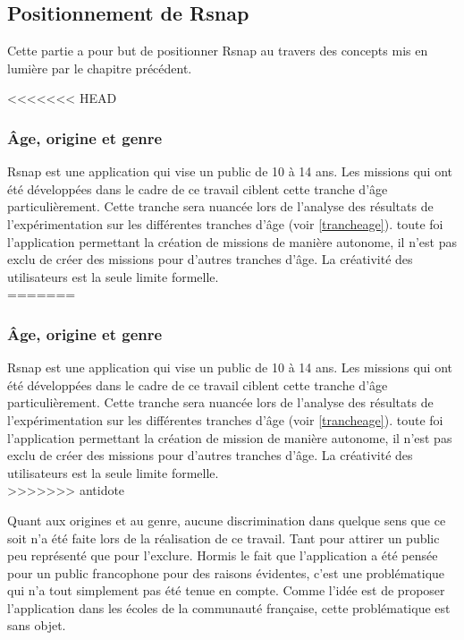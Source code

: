 ﻿\subsection{Positionnement de Rsnap}
Cette partie a pour but de positionner Rsnap au travers des concepts mis en lumière par le chapitre précédent.

<<<<<<< HEAD
\subsubsection{Âge, origine et genre}
\gls{Rsnap} est une application qui vise un public de 10 à 14 ans. Les \glspl{mission} qui ont été développées dans le cadre de ce travail ciblent cette tranche d'âge particulièrement. Cette tranche sera nuancée lors de l'analyse des résultats de l'expérimentation sur les différentes tranches d'âge (voir \ref{trancheage}). %
toute foi l'application permettant la création de \glspl{mission} de manière autonome, il n'est pas exclu de créer des \glspl{mission} pour d'autres tranches d'âge. La créativité des utilisateurs est la seule limite formelle.\\
=======
\subsubsection{Âge, origine et genre} 
Rsnap est une application qui vise un public de 10 à 14 ans. Les missions qui ont été développées dans le cadre de ce travail ciblent cette tranche d'âge particulièrement. Cette tranche sera nuancée lors de l'analyse des résultats de l'expérimentation sur les différentes tranches d'âge (voir \ref{trancheage}). %
toute foi l'application permettant la création de mission de manière autonome, il n'est pas exclu de créer des missions pour d'autres tranches d'âge. La créativité des utilisateurs est la seule limite formelle.\\
>>>>>>> antidote

Quant aux origines et au genre, aucune discrimination dans quelque sens que ce soit n'a été faite lors de la réalisation de ce travail. Tant pour attirer un public peu représenté que pour l'exclure. Hormis le fait que l'application a été pensée pour un public francophone pour des raisons évidentes, c'est une problématique qui n'a tout simplement pas été tenue en compte. Comme l'idée est de proposer l'application dans les écoles de la communauté française, cette problématique est sans objet.

